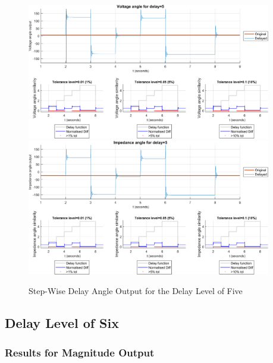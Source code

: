 \begin{figure}
    \caption{Step-Wise Delay Angle Output for the Delay Level of Five}
    \includegraphics[width=0.95\textwidth]{PMUsim-figures/DelayOf_5/Step_vAngle.png}    
    \includegraphics[width=0.95\textwidth]{PMUsim-figures/DelayOf_5/Step_iAngle.png}    
    \label{fig:PMUsimStep_Five_Angle}
        \begin{small}
     \end{small}
\end{figure}

\newpage \subsection{Delay Level of Six}
\subsubsection{Results for Magnitude Output}

